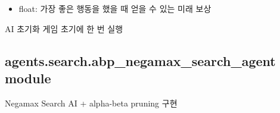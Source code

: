 \documentclass[letterpaper,10pt,english]{sphinxmanual}
\begin{document}
\begin{fulllineitems}
\begin{fulllineitems}
\begin{itemize}
\item {} 
float: 가장 좋은 행동을 했을 때 얻을 수 있는 미래 보상

\end{itemize}

\end{fulllineitems}


\begin{fulllineitems}
\label{\detokenize{agents.search:agents.search.negamax_search_agent.NegamaxSearchAgent.reset}}
AI 초기화
게임 초기에 한 번 실행

\end{fulllineitems}


\end{fulllineitems}



\subsection{agents.search.abp\_negamax\_search\_agent module}
\label{\detokenize{agents.search:agents-search-abp-negamax-search-agent-module}}\label{\detokenize{agents.search:module-agents.search.abp_negamax_search_agent}}
Negamax Search  AI + alpha-beta pruning 구현
\end{document}
